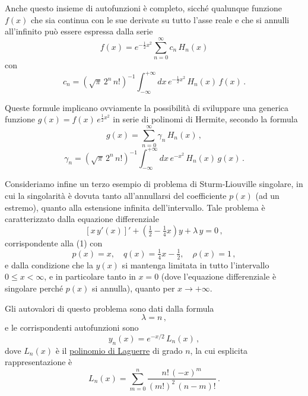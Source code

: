 \documentclass[11pt, a4paper]{book}
\numberwithin{equation}{section}
\begin{document}
Anche questo insieme di autofunzioni è completo, sicché
qualunque funzione $f(x)$ che sia continua con le sue derivate su tutto
l'asse reale e che si annulli all'infinito può essere espressa dalla
serie
\begin{equation}
f(x) = e^{-\frac{1}{2}x^2} \sum_{n=0}^{\infty} c_n\, H_n(x) \tag{39}
\end{equation}
con
\begin{equation}
c_n = \left(\sqrt{\pi}\, 2^n\, n!\right)^{-1} \int_{-\infty}^{+\infty} dx\, e^{-\frac{1}{2}x^2}\, H_n(x)\, f(x) \,. \tag{40}
\end{equation}


Queste formule implicano ovviamente la possibilità di sviluppare
una generica funzione $g(x) = f(x)\, e^{\frac{1}{2}x^2}$ in serie di polinomi di Hermite, secondo la formula
\begin{equation}
g(x) = \sum_{n=0}^{\infty} \gamma_n\, H_n(x) \,, \tag{41}
\end{equation}
\begin{equation}
\gamma_n = \left(\sqrt{\pi}\, 2^n\, n!\right)^{-1} \int_{-\infty}^{+\infty} dx\, e^{-x^2}\, H_n(x)\, g(x) \,. \tag{42}
\end{equation}

Consideriamo infine un terzo esempio di problema di Sturm-Liouville singolare, in cui la singolarità è dovuta tanto all'annullarsi del coefficiente $p(x)$ (ad un estremo), quanto alla estensione infinita dell'intervallo. Tale problema è caratterizzato dalla equazione differenziale
\begin{equation}
\left[x\, y'(x)\right]' + \left(\tfrac{1}{2} - \tfrac{1}{4}x\right) y + \lambda\, y = 0 \,, \tag{42}
\end{equation}
corrispondente alla (1) con
\begin{equation}
p(x) = x, \quad q(x) = \tfrac{1}{4}x - \tfrac{1}{2}, \quad \rho(x) = 1 \,, \tag{43}
\end{equation}
e dalla condizione che la $y(x)$ si mantenga limitata in tutto l'intervallo
$0 \leq x < \infty$, e in particolare tanto in $x=0$ (dove l'equazione differenziale è singolare perché $p(x)$ si annulla), quanto per $x \to +\infty$.

Gli autovalori di questo problema sono dati dalla formula
\begin{equation}
\lambda = n \,, \tag{44}
\end{equation}
e le corrispondenti autofunzioni sono
\begin{equation}
y_n(x) = e^{-x/2}\, L_n(x) \,, \tag{45}
\end{equation}
dove $L_n(x)$ è il \uline{polinomio di Laguerre} di grado $n$, la cui esplicita
rappresentazione è
\begin{equation}
L_n(x) = \sum_{m=0}^{n} \frac{n!\,(-x)^m}{(m!)^2\,(n-m)!} \,. \tag{46}
\end{equation}
\end{document}
